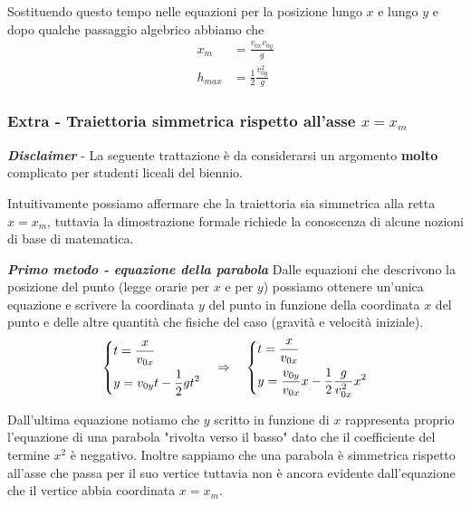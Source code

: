 \documentclass{article}
\begin{document}
Sostituendo questo tempo nelle equazioni per la posizione lungo $x$ e lungo $y$ e dopo qualche passaggio algebrico abbiamo che
\begin{align}
  x_m &= \frac{v_{0x}v_{0y}}{g} \\
  h_{max} &= \frac{1}{2}\frac{v_{0y}^2}{g}
\end{align}

\subsubsection{Extra - Traiettoria simmetrica rispetto all'asse $x=x_m$}
\textbf{\textit{Disclaimer}} - La seguente trattazione è da considerarsi un argomento \textbf{molto} complicato per studenti liceali del biennio.
\vspace{10pt}

Intuitivamente possiamo affermare che la traiettoria sia simmetrica alla retta $x=x_m$, tuttavia la dimostrazione formale richiede la conoscenza di alcune nozioni di base di matematica.

\textbf{\textit{Primo metodo - equazione della parabola}}
\newline
Dalle equazioni che descrivono la posizione del punto (legge orarie per $x$ e per $y$) possiamo ottenere un'unica equazione e scrivere la coordinata $y$ del punto in funzione della coordinata $x$ del punto e delle altre quantità che fisiche del caso (gravità e velocità iniziale).
\begin{equation}
  \begin{dcases}
    t = \frac{x}{v_{0x}}\\
    y = v_{0y} t - \frac{1}{2}gt^2
  \end{dcases}
  \quad\Rightarrow\quad
  \begin{dcases}
    t = \frac{x}{v_{0x}}\\
    y = \frac{v_{0y}}{v_{0x}} x - \frac{1}{2}\frac{g}{v_{0x}^2}x^2
  \end{dcases}
\end{equation}

Dall'ultima equazione notiamo che $y$ scritto in funzione di $x$ rappresenta proprio l'equazione di una parabola "rivolta verso il basso" dato che il coefficiente del termine $x^2$ è neggativo.
Inoltre sappiamo che una parabola è simmetrica rispetto all'asse che passa per il suo vertice tuttavia non è ancora evidente dall'equazione che il vertice abbia coordinata $x=x_m$.
\end{document}
